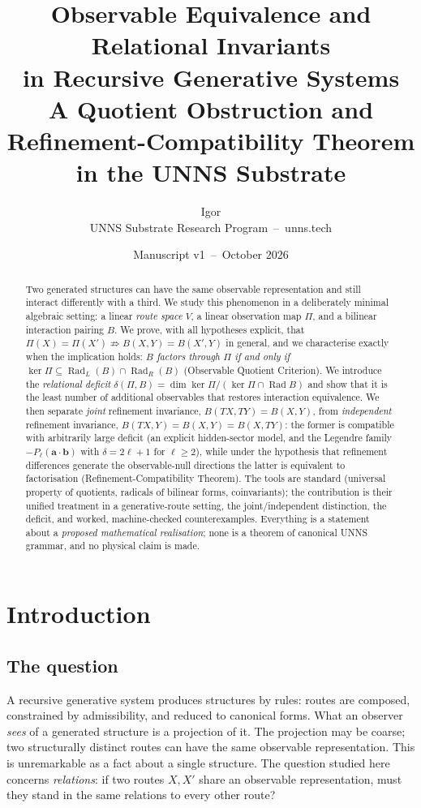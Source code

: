 \documentclass[11pt,a4paper]{article}
\title{\textbf{Observable Equivalence and Relational Invariants\\ in Recursive Generative Systems}\\[6pt]
\large A Quotient Obstruction and Refinement-Compatibility Theorem\\ in the UNNS Substrate}
\author{Igor\\[2pt]\small UNNS Substrate Research Program \,--\, unns.tech}
\date{Manuscript v1 \,--\, October 2026}
\newcommand{\Rad}{\operatorname{Rad}}
\newcommand{\defic}{\delta}
\theoremstyle{plain}
\theoremstyle{definition}
\begin{document}
\maketitle

\begin{abstract}
\noindent
Two generated structures can have the same observable representation and still interact differently with a third.
We study this phenomenon in a deliberately minimal algebraic setting: a linear \emph{route space} $V$, a linear observation map $\Pi$, and a bilinear interaction pairing $B$.
We prove, with all hypotheses explicit, that
$\Pi(X)=\Pi(X')\not\Rightarrow B(X,Y)=B(X',Y)$ in general, and we characterise exactly when the implication holds:
\emph{$B$ factors through $\Pi$ if and only if $\ker\Pi\subseteq\Rad_L(B)\cap\Rad_R(B)$} (Observable Quotient Criterion).
We introduce the \emph{relational deficit} $\defic(\Pi,B)=\dim\ker\Pi/(\ker\Pi\cap\Rad B)$ and show that it is the least number of additional observables that restores interaction equivalence.
We then separate \emph{joint} refinement invariance, $B(TX,TY)=B(X,Y)$, from \emph{independent} refinement invariance, $B(TX,Y)=B(X,Y)=B(X,TY)$: the former is compatible with arbitrarily large deficit (an explicit hidden-sector model, and the Legendre family $-P_\ell(\mathbf a\cdot\mathbf b)$ with $\defic=2\ell+1$ for $\ell\ge2$), while under the hypothesis that refinement differences generate the observable-null directions the latter is equivalent to factorisation (Refinement-Compatibility Theorem).
The tools are standard (universal property of quotients, radicals of bilinear forms, coinvariants); the contribution is their unified treatment in a generative-route setting, the joint/independent distinction, the deficit, and worked, machine-checked counterexamples.
Everything is a statement about a \emph{proposed mathematical realisation}; none is a theorem of canonical UNNS grammar, and no physical claim is made.
\end{abstract}

\tableofcontents
\newpage

\section{Introduction}\label{sec:intro}

\subsection{The question}
A recursive generative system produces structures by rules: routes are composed, constrained by admissibility, and reduced to canonical forms.
What an observer \emph{sees} of a generated structure is a projection of it.
The projection may be coarse; two structurally distinct routes can have the same observable representation.
This is unremarkable as a fact about a single structure.
The question studied here concerns \emph{relations}: if two routes $X,X'$ share an observable representation, must they stand in the same relations to every other route?
\end{document}
